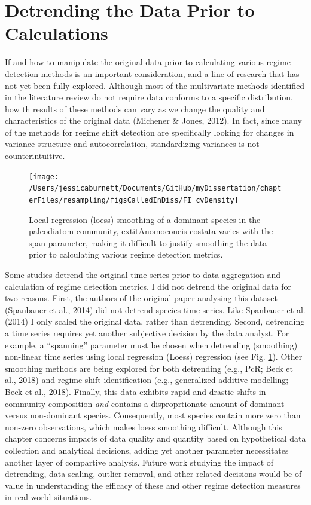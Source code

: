 \documentclass[12pt,twoside,openany]{reedthesis}
\begin{document}
\hypertarget{detrending-the-data-prior-to-calculations}{%
\section{Detrending the Data Prior to Calculations}\label{detrending-the-data-prior-to-calculations}}

If and how to manipulate the original data prior to calculating various regime detection methods is an important consideration, and a line of research that has not yet been fully explored. Although most of the multivariate methods identified in the literature review do not require data conforms to a specific distribution, how th results of these methods can vary as we change the quality and characteristics of the original data (Michener \& Jones, 2012). In fact, since many of the methods for regime shift detection are specifically looking for changes in variance structure and autocorrelation, standardizing variances is not counterintuitive.
\begin{figure}
\texttt{[image: /Users/jessicaburnett/Documents/GitHub/myDissertation/chapterFiles/resampling/figsCalledInDiss/FI\_cvDensity]} \caption{Local regression (loess) smoothing of a dominant species in the paleodiatom community,     extit{Anomoeoneis costata} varies with the span parameter, making it difficult to justify smoothing the data prior to calculating various regime detection metrics.}\label{fig:loessEx}
\end{figure}
Some studies detrend the original time series prior to data aggregation and calculation of regime detection metrics. I did not detrend the original data for two reasons. First, the authors of the original paper analysing this dataset (Spanbauer et al., 2014) did not detrend species time series. Like Spanbauer et al. (2014) I only scaled the original data, rather than detrending. Second, detrending a time series requires yet another subjective decision by the data analyst. For example, a ``spanning'' parameter must be chosen when detrending (smoothing) non-linear time series using local regression (Loess) regression (see Fig. \ref{fig:loessEx}). Other smoothing methods are being explored for both detrending (e.g., PcR; Beck et al., 2018) and regime shift identification (e.g., generalized additive modelling; Beck et al., 2018). Finally, this data exhibits rapid and drastic shifts in community composition \emph{and} contains a disproprtionate amount of dominant versus non-dominant species. Consequently, most species contain more zero than non-zero observations, which makes loess smoothing difficult. Although this chapter concerns impacts of data quality and quantity based on hypothetical data collection and analytical decisions, adding yet another parameter necessitates another layer of compartive analysis. Future work studying the impact of detrending, data scaling, outlier removal, and other related decisions would be of value in understanding the efficacy of these and other regime detection measures in real-world situations.
\end{document}
